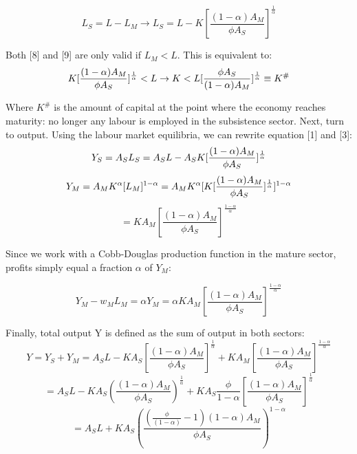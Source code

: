 \documentclass[a4paper]{article}
\begin{document}
\begin{equation}
L_S=L-L_M		\rightarrow		L_S=L-K[\frac{(1-\alpha) A_M }{\phi A_S}]^{\frac{1}{\alpha}}
\end{equation}

Both [8] and [9] are only valid if $L_M<L$. This is equivalent to:
\begin{equation}
K[\frac{(1-\alpha) A_M}{\phi A_S}]^{\frac{1}{\alpha}}<L	\\
\rightarrow	K<L[\frac{\phi A_S}{(1-\alpha) A_M}]^{\frac{1}{\alpha}}\equiv K^{\#}
\end{equation}

Where $K^{\#}$ is the amount of capital at the point where the economy reaches maturity: no longer any labour is employed in the subsistence sector. Next, turn to output. Using the labour market equilibria, we can rewrite equation [1] and [3]:
\begin{equation}
Y_S=A_S L_S=A_S L-A_S K[\frac{(1-\alpha) A_M}{\phi A_S}]^{\frac{1}{\alpha}} \\
\end{equation}
\begin{equation}
Y_M=A_M K^\alpha [L_M]^{1-\alpha}=A_M K^\alpha [K[\frac{(1-\alpha) A_M}{\phi A_S}]^{\frac{1}{\alpha}}]^{1-\alpha} \nonumber\\
\end{equation}
\begin{equation}
=K A_M [\frac{(1-\alpha) A_M}{\phi A_S}]^{\frac{1-\alpha}{\alpha}}
\end{equation}

Since we work with a Cobb-Douglas production function in the mature sector, profits simply equal a fraction $\alpha$ of $Y_M$:

\begin{equation}
Y_M-w_M L_M= \alpha Y_M=\alpha K A_M [\frac{(1-\alpha) A_M}{\phi A_S}]^{\frac{1-\alpha}{\alpha}}
\end{equation}

Finally, total output Y is defined as the sum of output in both sectors:
\begin{equation}
Y=Y_S+Y_M 	=A_S L-K A_S [\frac{(1-\alpha) A_M}{\phi A_S}]^{\frac{1}{\alpha}}+K A_M [\frac{(1-\alpha) A_M}{\phi A_S}]^{\frac{1-\alpha}{\alpha}} \nonumber
\end{equation}
\begin{equation}
=A_S L-KA_S (\frac{(1-\alpha) A_M}{\phi A_S })^{\frac{1}{\alpha}}+K A_S\frac{\phi}{1-\alpha}[\frac{(1- \alpha) A_M}{\phi A_S}]^{\frac{1}{\alpha}} \nonumber
\end{equation}
\begin{equation}
=A_S L+K A_S (\frac{(\frac{\phi}{(1-\alpha)}- 1)(1-\alpha)A_M}{\phi A_S})^{1-{\alpha}}
\end{equation}
\end{document}
